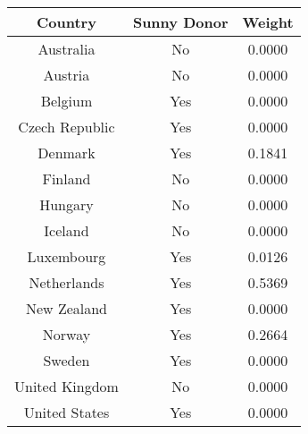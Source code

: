 \begin{tabular}{c|c|c}
\textbf{Country}&\textbf{Sunny Donor}&\textbf{Weight}\\
\hline 
Australia & No & 0.0000 \\ 
Austria & No & 0.0000 \\ 
Belgium & Yes & 0.0000 \\ 
Czech Republic & Yes & 0.0000 \\ 
Denmark & Yes & 0.1841 \\ 
Finland & No & 0.0000 \\ 
Hungary & No & 0.0000 \\ 
Iceland & No & 0.0000 \\ 
Luxembourg & Yes & 0.0126 \\ 
Netherlands & Yes & 0.5369 \\ 
New Zealand & Yes & 0.0000 \\ 
Norway & Yes & 0.2664 \\ 
Sweden & Yes & 0.0000 \\ 
United Kingdom & No & 0.0000 \\ 
United States & Yes & 0.0000 \\ 
\end{tabular}